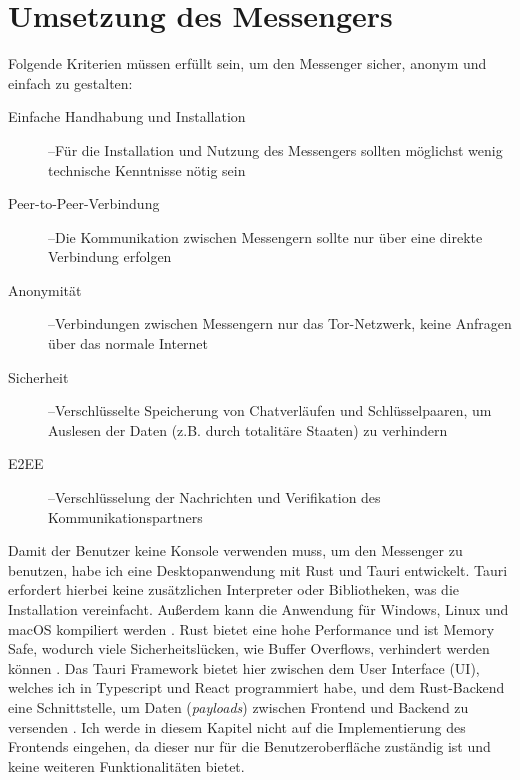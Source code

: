 \documentclass[a4paper,ngerman, headheight=28pt,12pt]{scrartcl}
\newcommand{\LongMinus}{–}
\newcommand{\vcite}[1]{\cite[vgl.][]{#1}}
\begin{document}
\section{Umsetzung des Messengers}
Folgende Kriterien müssen erfüllt sein, um den Messenger sicher, anonym und einfach zu gestalten:
\begin{description}
  \item[Einfache Handhabung und Installation] \LongMinus Für die Installation und Nutzung des Messengers sollten möglichst wenig technische Kenntnisse nötig sein
  \item[Peer-to-Peer-Verbindung] \LongMinus Die Kommunikation zwischen Messengern sollte nur über eine direkte Verbindung erfolgen
  \item[Anonymität] \LongMinus Verbindungen zwischen Messengern nur das Tor-Netzwerk, keine Anfragen über das normale Internet
  \item[Sicherheit] \LongMinus Verschlüsselte Speicherung von Chatverläufen und Schlüsselpaaren, um Auslesen der Daten (z.B. durch totalitäre Staaten) zu verhindern
  \item[E2EE] \LongMinus Verschlüsselung der Nachrichten und Verifikation des Kommunikationspartners
\end{description}
Damit der Benutzer keine Konsole verwenden muss, um den Messenger zu benutzen, habe ich eine Desktopanwendung mit Rust und Tauri entwickelt. Tauri erfordert hierbei keine zusätzlichen Interpreter oder Bibliotheken, was die Installation vereinfacht.
Außerdem kann die Anwendung für Windows, Linux und macOS kompiliert werden \vcite{RustCompile}. Rust bietet eine hohe Performance und ist Memory Safe, wodurch viele Sicherheitslücken, wie Buffer Overflows, verhindert werden können \vcite{RustSecurity}. Das Tauri Framework bietet hier zwischen dem User Interface (UI), welches ich in Typescript und React programmiert habe, und dem Rust-Backend eine Schnittstelle, um Daten (\textit{payloads}) zwischen Frontend und Backend zu versenden \vcite{TauriPayloads}. Ich werde in diesem Kapitel nicht auf die Implementierung des Frontends eingehen, da dieser nur für die Benutzeroberfläche zuständig ist und keine weiteren Funktionalitäten bietet.
\end{document}
